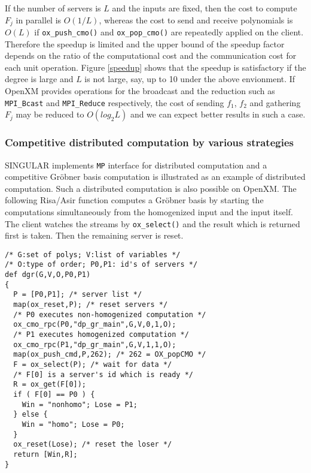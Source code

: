 If the number of servers is $L$ and the inputs are fixed, then the cost to
compute $F_j$ in parallel is $O(1/L)$, whereas the cost
to send and receive polynomials is $O(L)$ if {\tt ox\_push\_cmo()} and
{\tt ox\_pop\_cmo()} are repeatedly applied on the client.
Therefore the speedup is limited and the upper bound of
the speedup factor depends on the ratio of 
the computational cost and the communication cost for each unit operation.
Figure \ref{speedup} shows that 
the speedup is satisfactory if the degree is large and $L$
is not large, say, up to 10 under the above envionment.
If OpenXM provides operations for the broadcast and the reduction
such as {\tt MPI\_Bcast} and {\tt MPI\_Reduce} respectively, the cost of 
sending $f_1$, $f_2$ and gathering $F_j$ may be reduced to $O(log_2L)$
and we can expect better results in such a case.

\subsubsection{Competitive distributed computation by various strategies}

SINGULAR \cite{Singular} implements {\tt MP} interface for distributed
computation and a competitive Gr\"obner basis computation is
illustrated as an example of distributed computation.
Such a distributed computation is also possible on OpenXM.
The following Risa/Asir function computes a Gr\"obner basis by
starting the computations simultaneously from the homogenized input and
the input itself.  The client watches the streams by {\tt ox\_select()}
and the result which is returned first is taken. Then the remaining
server is reset.

\begin{verbatim}
/* G:set of polys; V:list of variables */
/* O:type of order; P0,P1: id's of servers */
def dgr(G,V,O,P0,P1)
{
  P = [P0,P1]; /* server list */
  map(ox_reset,P); /* reset servers */
  /* P0 executes non-homogenized computation */
  ox_cmo_rpc(P0,"dp_gr_main",G,V,0,1,O);
  /* P1 executes homogenized computation */
  ox_cmo_rpc(P1,"dp_gr_main",G,V,1,1,O);
  map(ox_push_cmd,P,262); /* 262 = OX_popCMO */
  F = ox_select(P); /* wait for data */
  /* F[0] is a server's id which is ready */
  R = ox_get(F[0]);
  if ( F[0] == P0 ) {
    Win = "nonhomo"; Lose = P1;
  } else {
    Win = "homo"; Lose = P0;
  }
  ox_reset(Lose); /* reset the loser */
  return [Win,R];
}
\end{verbatim}
